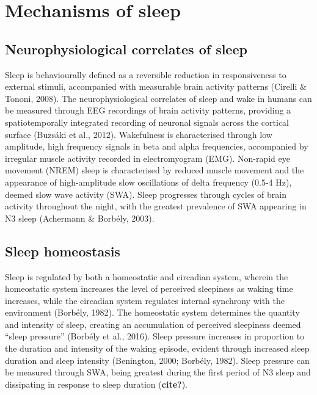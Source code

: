 \documentclass[
]{article}
\begin{document}
\section{Mechanisms of sleep}\label{mechanisms-of-sleep}

\subsection{Neurophysiological correlates of
sleep}\label{neurophysiological-correlates-of-sleep}

Sleep is behaviourally defined as a reversible reduction in
responsiveness to external stimuli, accompanied with measurable brain
activity patterns (Cirelli \& Tononi, 2008). The neurophysiological
correlates of sleep and wake in humans can be measured through EEG
recordings of brain activity patterns, providing a spatiotemporally
integrated recording of neuronal signals across the cortical surface
(Buzsáki et al., 2012). Wakefulness is characterised through low
amplitude, high frequency signals in beta and alpha frequencies,
accompanied by irregular muscle activity recorded in electromyogram
(EMG). Non-rapid eye movement (NREM) sleep is characterised by reduced
muscle movement and the appearance of high-amplitude slow oscillations
of delta frequency (0.5-4 Hz), deemed slow wave activity (SWA). Sleep
progresses through cycles of brain activity throughout the night, with
the greatest prevalence of SWA appearing in N3 sleep (Achermann \&
Borbély, 2003).

\subsection{Sleep homeostasis}\label{sleep-homeostasis}

Sleep is regulated by both a homeostatic and circadian system, wherein
the homeostatic system increases the level of perceived sleepiness as
waking time increases, while the circadian system regulates internal
synchrony with the environment (Borbély, 1982). The homeostatic system
determines the quantity and intensity of sleep, creating an accumulation
of perceived sleepiness deemed ``sleep pressure'' (Borbély et al.,
2016). Sleep pressure increases in proportion to the duration and
intensity of the waking episode, evident through increased sleep
duration and sleep intensity (Benington, 2000; Borbély, 1982). Sleep
pressure can be measured through SWA, being greatest during the first
period of N3 sleep and dissipating in response to sleep duration
(\textbf{cite?}).
\end{document}
